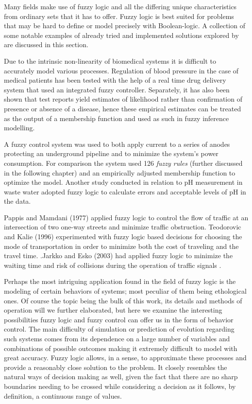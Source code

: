 Many fields make use of fuzzy logic and all the differing unique characteristics from ordinary sets that it has to offer. Fuzzy logic is best suited for problems that may be hard to define or model precisely with Boolean-logic. A collection of some notable examples of already tried and implemented solutions explored by \cite{makkar2018} are discussed in this section.

Due to the intrinsic non-linearity of biomedical systems it is difficult to accurately model various processes. Regulation of blood pressure in the case of medical patients has been tested with the help of a real time drug delivery system that used an integrated fuzzy controller. Separately, it has also been shown that test reports yield estimates of likelihood rather than confirmation of presence or absence of a disease, hence these empirical estimates can be treated as the output of a membership function and used as such in fuzzy inference modelling.

A fuzzy control system was used to both apply current to a series of anodes protecting an underground pipeline and to minimize the system's power consumption. For comparison the system used 126 \textit{fuzzy rules} (further discussed in the following chapter) and an empirically adjusted membership function to optimize the model. Another study conducted in relation to pH measurement in waste water adopted fuzzy logic to calculate errors and acceptable levels of pH in the data. 

Pappis and Mamdani (1977) applied fuzzy logic to control the flow of traffic at an intersection of two one-way streets and minimize traffic obstruction. Teodorovic and Kalie (1996) experimented with fuzzy logic based decisions for choosing the mode of transportation in order to minimize both the cost of traveling and the travel time. .Jarkko and Esko (2003) had applied fuzzy logic to minimize the waiting time and risk of collisions during the operation of traffic signals .

Perhaps the most intriguing application found in the field of fuzzy logic is the modeling of certain behaviors of systems; most peculiar of them being ethological ones. Of course the topic being the bulk of this work, its details and methods of operation will we further elaborated, but here we examine the interesting possibilities fuzzy logic and fuzzy control can offer us in the form of  behavior control. The main difficulty of simulation or prediction of evolution regarding such systems comes from its dependence on a large number of variables and combinations of possible outcomes making it extremely difficult to model with great accuracy. Fuzzy logic allows, in a sense, to approximate these processes and provide a reasonably close solution to the problem. It closely resembles the natural ways of decision making as well, given the fact that there are no sharp boundaries needing to be crossed while considering a decision as it follows, by definition, a continuous range of values.

